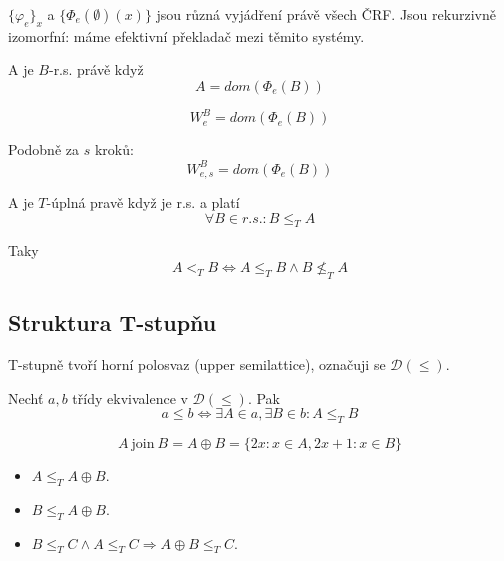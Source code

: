 \begin{note}
	$\{ \varphi_e \}_x$ a $\{ \Phi_e(\emptyset)(x) \}$ jsou různá vyjádření právě všech ČRF.
	Jsou rekurzivně izomorfní: máme efektivní překladač mezi těmito systémy.
\end{note}

\begin{definition}
	A je $B$-r.s. právě když
	\[ A = dom(\Phi_e(B)) \]
\end{definition}

\begin{notation}[e-ta B-r.s. množina]
	\[ W^B_e = dom(\Phi_e(B)) \]

	Podobně za $s$ kroků:
	\[ W^B_{e, s} = dom(\Phi_e(B)) \]
\end{notation}

\begin{definition}[T-úplnost]
	A je $T$-úplná pravě když je r.s. a platí
	\[ \forall B \in r.s.: B \leq_T A \]

	Taky
	\[ A <_T B \iff A \leq_T B \land B \nleq_T A \]
\end{definition}

\subsection{Struktura T-stupňu}

\begin{definition}
	T-stupně tvoří horní polosvaz (upper semilattice), označuji se $\mathcal{D}(\leq)$.

	Nechť $a, b$ třídy ekvivalence v $\mathcal{D}(\leq)$.
	Pak
	\[ a \leq b \iff \exists A \in a, \exists B \in b: A \leq_T B \]
\end{definition}

\begin{definition}[Join]
	\[ A \ \text{join}\ B = A \oplus B = \{ 2x: x \in A, 2x + 1: x \in B \} \]
\end{definition}

\begin{properties}[Join]
	\begin{itemize}
		\item $A \leq_T A \oplus B$.
		\item $B \leq_T A \oplus B$.
		\item $B \leq_T C \land A \leq_T C \Rightarrow A \oplus B \leq_T C$.
	\end{itemize}
\end{properties}

